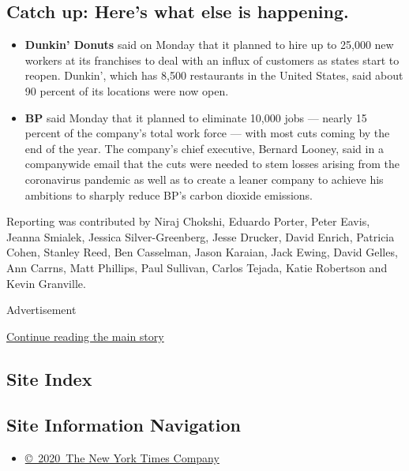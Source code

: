 \hypertarget{catch-up-heres-what-else-is-happening}{%
\subsection{Catch up: Here's what else is
happening.}\label{catch-up-heres-what-else-is-happening}}

\begin{itemize}
\item
  \textbf{Dunkin' Donuts} said on Monday that it planned to hire up to
  25,000 new workers at its franchises to deal with an influx of
  customers as states start to reopen. Dunkin', which has 8,500
  restaurants in the United States, said about 90 percent of its
  locations were now open.
\item
  \textbf{BP} said Monday that it planned to eliminate 10,000 jobs ---
  nearly 15 percent of the company's total work force --- with most cuts
  coming by the end of the year. The company's chief executive, Bernard
  Looney, said in a companywide email that the cuts were needed to stem
  losses arising from the coronavirus pandemic as well as to create a
  leaner company to achieve his ambitions to sharply reduce BP's carbon
  dioxide emissions.
\end{itemize}

Reporting was contributed by Niraj Chokshi, Eduardo Porter, Peter Eavis,
Jeanna Smialek, Jessica Silver-Greenberg, Jesse Drucker, David Enrich,
Patricia Cohen, Stanley Reed, Ben Casselman, Jason Karaian, Jack Ewing,
David Gelles, Ann Carrns, Matt Phillips, Paul Sullivan, Carlos Tejada,
Katie Robertson and Kevin Granville.

Advertisement

\protect\hyperlink{after-bottom}{Continue reading the main story}

\hypertarget{site-index}{%
\subsection{Site Index}\label{site-index}}

\hypertarget{site-information-navigation}{%
\subsection{Site Information
Navigation}\label{site-information-navigation}}

\begin{itemize}
\tightlist
\item
  \href{https://help.nytimes3xbfgragh.onion/hc/en-us/articles/115014792127-Copyright-notice}{©~2020~The
  New York Times Company}
\end{itemize}

